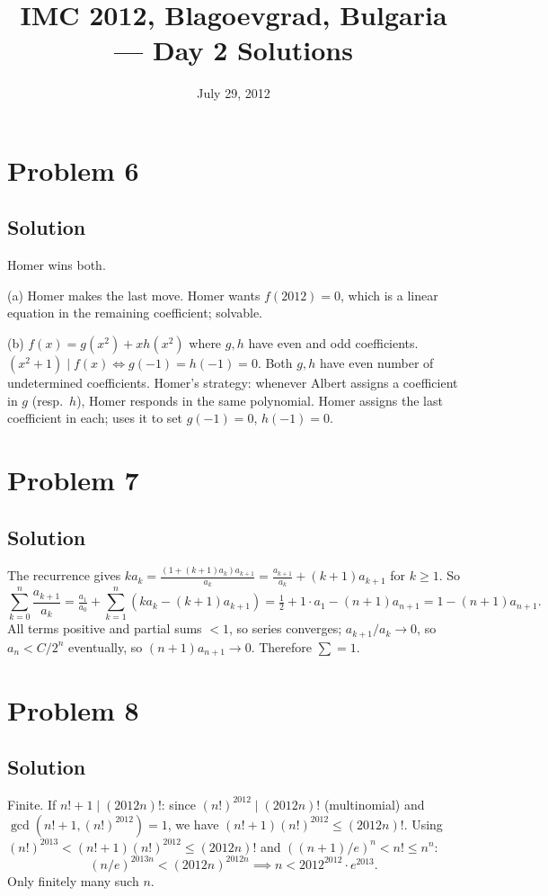 \documentclass{article}
\title{IMC 2012, Blagoevgrad, Bulgaria --- Day 2 Solutions}
\date{July 29, 2012}
\begin{document}
\maketitle

\section*{Problem 6}
\subsection*{Solution}
Homer wins both.

(a) Homer makes the last move. Homer wants $f(2012) = 0$, which is a linear equation in the remaining coefficient; solvable.

(b) $f(x) = g(x^2) + x h(x^2)$ where $g, h$ have even and odd coefficients. $(x^2+1) \mid f(x) \iff g(-1) = h(-1) = 0$. Both $g, h$ have even number of undetermined coefficients. Homer's strategy: whenever Albert assigns a coefficient in $g$ (resp.\ $h$), Homer responds in the same polynomial. Homer assigns the last coefficient in each; uses it to set $g(-1) = 0$, $h(-1) = 0$.

\section*{Problem 7}
\subsection*{Solution}
The recurrence gives $k a_k = \frac{(1 + (k+1) a_k) a_{k+1}}{a_k} = \frac{a_{k+1}}{a_k} + (k+1) a_{k+1}$ for $k \ge 1$. So
\[ \sum_{k=0}^n \frac{a_{k+1}}{a_k} = \tfrac{a_1}{a_0} + \sum_{k=1}^n (k a_k - (k+1) a_{k+1}) = \tfrac{1}{2} + 1 \cdot a_1 - (n+1) a_{n+1} = 1 - (n+1) a_{n+1}. \]
All terms positive and partial sums $< 1$, so series converges; $a_{k+1}/a_k \to 0$, so $a_n < C/2^n$ eventually, so $(n+1) a_{n+1} \to 0$. Therefore $\sum = 1$.

\section*{Problem 8}
\subsection*{Solution}
Finite. If $n! + 1 \mid (2012n)!$: since $(n!)^{2012} \mid (2012n)!$ (multinomial) and $\gcd(n!+1, (n!)^{2012}) = 1$, we have $(n!+1)(n!)^{2012} \le (2012 n)!$. Using $(n!)^{2013} < (n!+1)(n!)^{2012} \le (2012n)!$ and $((n+1)/e)^n < n! \le n^n$:
\[ (n/e)^{2013 n} < (2012 n)^{2012 n} \implies n < 2012^{2012} \cdot e^{2013}. \]
Only finitely many such $n$.
\end{document}
